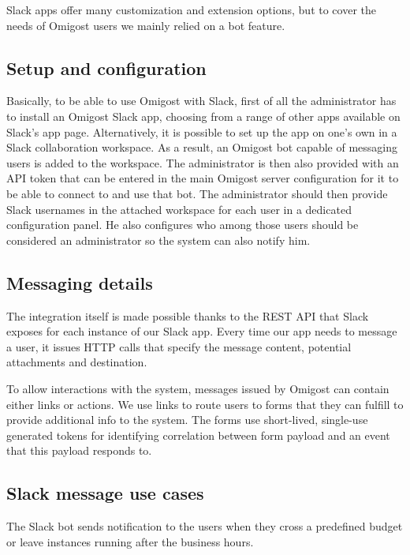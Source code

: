 \documentclass[licencjacka,en]{thesisclass}
\begin{document}
    Slack apps offer many customization and extension options, but to cover
    the needs of Omigost users we mainly relied on a bot feature.

    \subsection{Setup and configuration}

    Basically, to be able to use Omigost with Slack, first of all the administrator
    has to install an Omigost Slack app, choosing from a range of other apps
    available on Slack's app page.
    Alternatively, it is possible to set up the app on one's own
    in a Slack collaboration workspace.
    As a result, an Omigost bot capable of messaging users is added to the workspace.
    The administrator is then also provided with an API token that can be entered in
    the main Omigost server configuration for it to be able
    to connect to and use that bot.
    The administrator should then provide Slack usernames in the attached
    workspace for each user in a dedicated configuration panel.
    He also configures who among those users should be considered an administrator
    so the system can also notify him.

    \subsection{Messaging details}

    The integration itself is made possible thanks to the REST API
    that Slack exposes for each instance of our Slack app.
    Every time our app needs to message a user, it issues HTTP
    calls that specify the message content, potential attachments and destination.

    To allow interactions with the system, messages issued by Omigost
    can contain either links or actions.
    We use links to route users to forms that they can fulfill
    to provide additional info to the system.
    The forms use short-lived, single-use generated tokens for identifying
    correlation between form payload and an event that this payload responds to.

    \subsection{Slack message use cases}

    The Slack bot sends notification to the users when they cross
    a predefined budget or leave instances running after the business hours.
\end{document}
